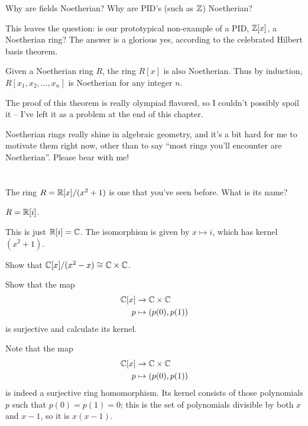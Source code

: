 \begin{ques}
	Why are fields Noetherian?
	Why are PID's (such as $\mathbb Z$) Noetherian?
\end{ques}

This leaves the question:
is our prototypical non-example of a PID,
$\mathbb Z[x]$, a Noetherian ring?
The answer is a glorious yes,
according to the celebrated Hilbert basis theorem.
\begin{theorem}
	Given a Noetherian ring $R$,
	the ring $R[x]$ is also Noetherian.
	Thus by induction, $R[x_1, x_2, \dots, x_n]$ is Noetherian
	for any integer $n$.
	\label{thm:hilbert_basis}
\end{theorem}
The proof of this theorem is really olympiad flavored,
so I couldn't possibly spoil it -- I've
left it as a problem at the end of this chapter.

Noetherian rings really shine in algebraic geometry,
and it's a bit hard for me to motivate them right now,
other than to say
``most rings you'll encounter are Noetherian''.
Please bear with me!

\section{\problemhead}

\begin{problem}
	The ring $R = \mathbb R[x] / (x^2+1)$ is one that you've seen before.
	What is its name?
	\begin{hint}
		$R = \mathbb R[i]$.
	\end{hint}
	\begin{sol}
		This is just $\mathbb R[i] = \mathbb C$.
		The isomorphism is given by $x \mapsto i$,
		which has kernel $(x^2+1)$.
	\end{sol}
\end{problem}

\begin{problem}
	Show that $\mathbb C[x] / (x^2-x) \cong \mathbb C \times \mathbb C$.
	\begin{hint}
		Show that the map
		\begin{align*}
			\mathbb C[x] &\to \mathbb C \times \mathbb C \\
			p &\mapsto \left( p(0), p(1) \right)
		\end{align*}
		is surjective and calculate its kernel.
	\end{hint}
	\begin{sol}
		Note that the map
		\begin{align*}
			\mathbb C[x] &\to \mathbb C \times \mathbb C \\
			p &\mapsto \left( p(0), p(1) \right)
		\end{align*}
		is indeed a surjective ring homomorphism.
		Its kernel consists of those polynomials $p$ such that $p(0) = p(1) = 0$;
		this is the set of polynomials divisible by both $x$ and $x-1$, so it is $x(x-1)$.
	\end{sol}
\end{problem}

